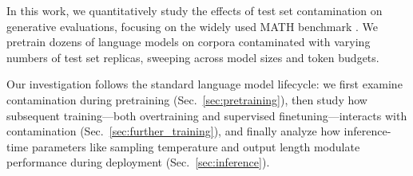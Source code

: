 In this work, we quantitatively study the effects of test set contamination on generative evaluations, focusing on the widely used MATH benchmark \citep{hendrycks2021measuringmathematicalproblemsolving}. 
We pretrain dozens of language models on corpora contaminated with varying numbers of test set replicas, sweeping across model sizes and token budgets.
%    


%
Our investigation follows the standard language model lifecycle: we first examine contamination during pretraining (Sec.~\ref{sec:pretraining}), then study how subsequent training---both overtraining and supervised finetuning---interacts with contamination (Sec.~\ref{sec:further_training}), and finally analyze how inference-time parameters like sampling temperature and output length modulate performance during deployment (Sec.~\ref{sec:inference}).
